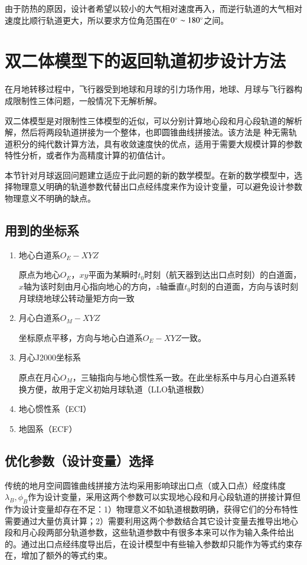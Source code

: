 由于防热的原因，设计者希望以较小的大气相对速度再入，而逆行轨道的大气相对速度比顺行轨道更大，所以要求方位角范围在$0^\circ\sim 180^\circ$之间。

\section{双二体模型下的返回轨道初步设计方法}
在月地转移过程中，飞行器受到地球和月球的引力场作用，地球、月球与飞行器构成限制性三体问题，一般情况下无解析解。

双二体模型是对限制性三体模型的近似，可以分别计算地心段和月心段轨道的解析解，然后将两段轨道拼接为一个整体，也即圆锥曲线拼接法。该方法是
种无需轨道积分的纯代数计算方法，具有收敛速度快的优点，适用于需要大规模计算的参数特性分析，或者作为高精度计算的初值估计。

本节针对月球返回问题建立适应于此问题的新的数学模型。在新的数学模型中，选择物理意乂明确的轨道参数代替出口点经纬度来作为设计变量，可以避免设计参数物理意义不明确的缺点。

\subsection{用到的坐标系}

\begin{enumerate}[label=\arabic*)]
	\item 地心白道系$O_E-XYZ$

		  原点为地心$ O_E $，$ xy $平面为某瞬时$ t_0 $时刻（航天器到达出口点时刻）的白道面， $ x $轴为该时刻由月心指向地心的方向，$ z $轴垂直$ t_0 $时刻的白道面，方向与该时刻月球绕地球公转动量矩方向一致
	\item 月心白道系$O_M-XYZ$

			坐标原点平移，方向与地心白道系$O_E-XYZ$一致。
	\item 月心J2000坐标系

			原点在月心$ O_M $，三轴指向与地心惯性系一致。在此坐标系中与月心白道系转换方便，故用于定义初始月球轨道（LLO轨道根数）
	\item 地心惯性系（ECI）
	\item 地固系（ECF）
\end{enumerate}
\subsection{优化参数（设计变量）选择}
传统的地月空间圆锥曲线拼接方法均采用影响球出口点（或入口点）经度纬度$ \lambda_B,\phi_B $作为设计变量，采用这两个参数可以实现地心段和月心段轨道的拼接计算但作为设计变量却存在不足：1）物理意义不如轨道根数明确，获得它们的分布特性需要通过大量仿真计算；2）需要利用这两个参数结合其它设计变量去推导出地心段和月心段两部分轨道参数，这些轨道参数中有很多本来可以作为输入条件给出的。通过出口点经纬度导出后，在设计模型中有些输入参数却只能作为等式约束存在，增加了额外的等式约束。

